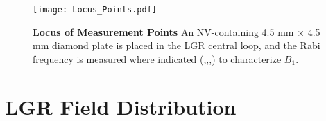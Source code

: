 

%


\begin{figure}[t!]
\centering
\texttt{[image: Locus\_Points.pdf]}  
\caption{\textbf{Locus of Measurement Points}  An NV-containing 4.5 mm $\times$ 4.5 mm diamond plate is placed in the LGR central loop, and the  Rabi frequency is measured where indicated (\textcolor{deepmagenta}{\textbullet},\textcolor{black}{\textbullet},\textcolor{red}{\textbullet},\textcolor{blue}{\textbullet}) to characterize $B_1$.}
\label{LGR_Locus}
\end{figure}


\section{LGR Field Distribution} \label{LGRfield}

